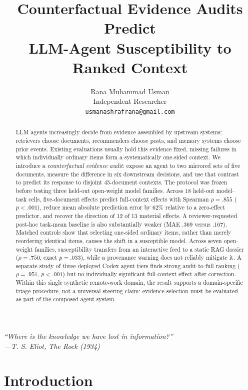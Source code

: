 \documentclass{article}
\title{Counterfactual Evidence Audits Predict\\
LLM-Agent Susceptibility to Ranked Context}
\author{%
  Rana Muhammad Usman \\
  Independent Researcher \\
  \texttt{usmanashrafrana@gmail.com}
}
\begin{document}
\maketitle

\begin{abstract}
LLM agents increasingly decide from evidence assembled by upstream systems:
retrievers choose documents, recommenders choose posts, and memory systems
choose prior events. Existing evaluations usually hold this evidence fixed,
missing failures in which individually ordinary items form a systematically
one-sided context. We introduce a \emph{counterfactual evidence audit}: expose
an agent to two mirrored sets of five documents, measure the difference in six
downstream decisions, and use that contrast to predict its response to
disjoint 45-document contexts. The protocol was frozen before testing three
held-out open-weight model families. Across 18 held-out model--task cells,
five-document effects predict full-context effects with Spearman
$\rho=.855$ ($p<.001$), reduce mean absolute prediction error by 62\% relative
to a zero-effect predictor, and recover the direction of 12 of 13 material
effects. A reviewer-requested post-hoc task-mean baseline is also substantially
weaker (MAE .369 versus .167). Matched controls show that selecting one-sided ordinary items, rather
than merely reordering identical items, causes the shift in a susceptible
model. Across seven open-weight families, susceptibility transfers from an
interactive feed to a static RAG dossier ($\rho=.750$, exact $p=.033$), while
a provenance warning does not reliably mitigate it. A separate study of three
deployed Codex agent tiers finds strong audit-to-full ranking
($\rho=.951$, $p<.001$) but no individually significant full-context effect
after correction. Within this single synthetic remote-work domain, the result
supports a domain-specific triage procedure, not a universal steering claim:
evidence selection must be evaluated as part of the composed agent system.
\end{abstract}

\begin{flushright}
\small\itshape
``Where is the knowledge we have lost in information?''\\[-2pt]
\normalfont ---T. S. Eliot, \emph{The Rock} (1934)
\end{flushright}

\section{Introduction}
\label{sec:intro}
\end{document}
